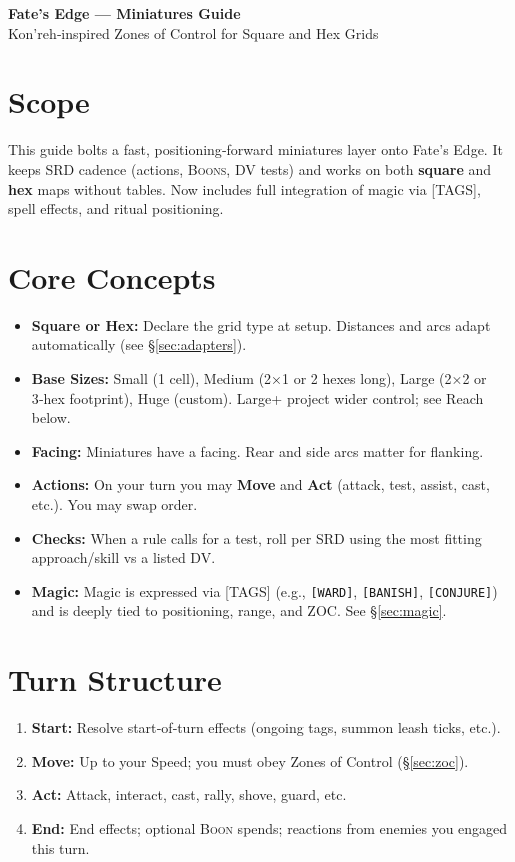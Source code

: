\documentclass[11pt]{article}
\newcommand{\Boon}{\textsc{Boon}}
\newcommand{\Boons}{\textsc{Boons}}
\newcommand{\DV}{\textsc{DV}}
\newcommand{\Tag}[1]{\texttt{[#1]}}
\begin{document}
\begin{center}
{\LARGE \textbf{Fate’s Edge — Miniatures Guide}}\\[4pt]
{\large Kon’reh‑inspired Zones of Control for Square and Hex Grids}
\end{center}

\section{Scope}
This guide bolts a fast, positioning‑forward miniatures layer onto Fate’s Edge. It keeps SRD cadence (actions, \Boons{}, \DV{} tests) and works on both \textbf{square} and \textbf{hex} maps without tables. Now includes full integration of magic via [TAGS], spell effects, and ritual positioning.

\section{Core Concepts}
\begin{itemize}
  \item \textbf{Square or Hex:} Declare the grid type at setup. Distances and arcs adapt automatically (see \S\ref{sec:adapters}).
  \item \textbf{Base Sizes:} Small (1 cell), Medium (2×1 or 2 hexes long), Large (2×2 or 3‑hex footprint), Huge (custom). Large+ project wider control; see Reach below.
  \item \textbf{Facing:} Miniatures have a facing. Rear and side arcs matter for flanking.
  \item \textbf{Actions:} On your turn you may \textbf{Move} and \textbf{Act} (attack, test, assist, cast, etc.). You may swap order.
  \item \textbf{Checks:} When a rule calls for a test, roll per SRD using the most fitting approach/skill vs a listed \DV{}.
  \item \textbf{Magic:} Magic is expressed via [TAGS] (e.g., \Tag{WARD}, \Tag{BANISH}, \Tag{CONJURE}) and is deeply tied to positioning, range, and ZOC. See \S\ref{sec:magic}.
\end{itemize}

\section{Turn Structure}
\begin{enumerate}
  \item \textbf{Start:} Resolve start‑of‑turn effects (ongoing tags, summon leash ticks, etc.).
  \item \textbf{Move:} Up to your Speed; you must obey Zones of Control (\S\ref{sec:zoc}).
  \item \textbf{Act:} Attack, interact, cast, rally, shove, guard, etc.
  \item \textbf{End:} End effects; optional \Boon{} spends; reactions from enemies you engaged this turn.
\end{enumerate}
\end{document}
